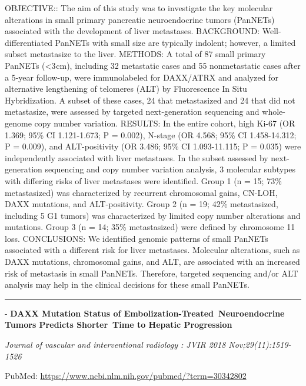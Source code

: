 \documentclass[]{article}
\begin{document}
OBJECTIVE:: The aim of this study was to investigate the key molecular
alterations in small primary pancreatic neuroendocrine tumors (PanNETs)
associated with the development of liver metastases. BACKGROUND:
Well-differentiated PanNETs with small size are typically indolent;
however, a limited subset metastasize to the liver. METHODS: A total of
87 small primary PanNETs (\textless{}3 cm), including 32 metastatic
cases and 55 nonmetastatic cases after a 5-year follow-up, were
immunolabeled for DAXX/ATRX and analyzed for alternative lengthening of
telomeres (ALT) by Fluorescence In Situ Hybridization. A subset of these
cases, 24 that metastasized and 24 that did not metastasize, were
assessed by targeted next-generation sequencing and whole-genome copy
number variation. RESULTS: In the entire cohort, high Ki-67 (OR 1.369;
95\% CI 1.121-1.673; P = 0.002), N-stage (OR 4.568; 95\% CI
1.458-14.312; P = 0.009), and ALT-positivity (OR 3.486; 95\% CI
1.093-11.115; P = 0.035) were independently associated with liver
metastases. In the subset assessed by next-generation sequencing and
copy number variation analysis, 3 molecular subtypes with differing
risks of liver metastases were identified. Group 1 (n = 15; 73\%
metastasized) was characterized by recurrent chromosomal gains, CN-LOH,
DAXX mutations, and ALT-positivity. Group 2 (n = 19; 42\% metastasized,
including 5 G1 tumors) was characterized by limited copy number
alterations and mutations. Group 3 (n = 14; 35\% metastasized) were
defined by chromosome 11 loss. CONCLUSIONS: We identified genomic
patterns of small PanNETs associated with a different risk for liver
metastases. Molecular alterations, such as DAXX mutations, chromosomal
gains, and ALT, are associated with an increased risk of metastasis in
small PanNETs. Therefore, targeted sequencing and/or ALT analysis may
help in the clinical decisions for these small PanNETs.

{}

{}

\begin{center}\rule{0.5\linewidth}{\linethickness}\end{center}

 - \textbf{DAXX Mutation Status of Embolization-Treated~Neuroendocrine
Tumors Predicts Shorter~Time to Hepatic Progression}

\emph{Journal of vascular and interventional radiology : JVIR 2018
Nov;29(11):1519-1526}

PubMed: \url{https://www.ncbi.nlm.nih.gov/pubmed/?term=30342802}
\end{document}
